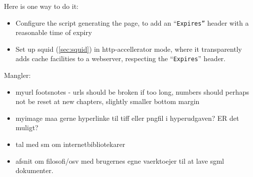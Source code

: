 \documentclass[11pt,draft,a4paper]{book}
\begin{document}
Here is one way to do it:

\begin{itemize}
\item Configure the script generating the page, to add an
  ``\texttt{Expires''} header with a reasonable time of expiry
\item Set up squid (\vref{sec:squid}) in http-accellerator mode, where
  it transparently adds cache facilities to a webserver, respecting
  the ``\texttt{Expires}'' header.
\end{itemize}


Mangler:

\begin{itemize}
\item myurl footsnotes - urls should be broken if too long, numbers
  should perhaps not be reset at new chapters, slightly smaller bottom
  margin 
  
  
  
\item myimage maa gerne hyperlinke til tiff eller pngfil i
  hyperudgaven?  ER det muligt?
\item tal med sm om internetbibliotekarer
\item afsnit om filosofi/osv med brugernes egne vaerktoejer til at
  lave sgml dokumenter.

  
\end{itemize}
\end{document}
